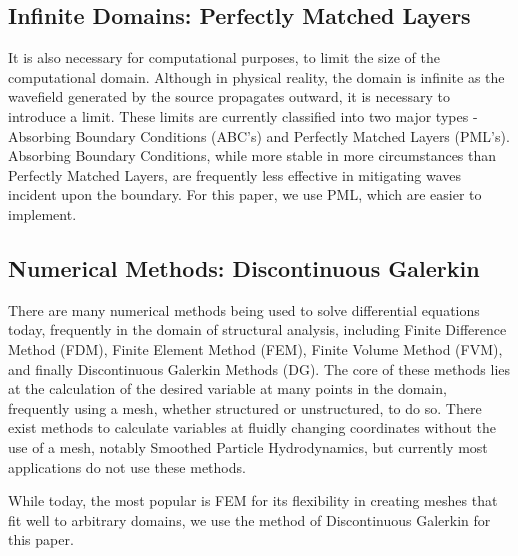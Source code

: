 \subsection{Infinite Domains: Perfectly Matched Layers}

It is also necessary for computational purposes, to limit the size of the computational domain. Although in physical reality, the domain is infinite as the wavefield generated by the source propagates outward, it is necessary to introduce a limit. These limits are currently classified into two major types - Absorbing Boundary Conditions (ABC's) and Perfectly Matched Layers (PML's). Absorbing Boundary Conditions, while more stable in more circumstances than Perfectly Matched Layers, are frequently less effective in mitigating waves incident upon the boundary. For this paper, we use PML, which are easier to implement.

\subsection{Numerical Methods: Discontinuous Galerkin}

There are many numerical methods being used to solve differential equations today, frequently in the domain of structural analysis, including Finite Difference Method (FDM), Finite Element Method (FEM), Finite Volume Method (FVM), and finally Discontinuous Galerkin Methods (DG). The core of these methods lies at the calculation of the desired variable at many points in the domain, frequently using a mesh, whether structured or unstructured, to do so. There exist methods to calculate variables at fluidly changing coordinates without the use of a mesh, notably Smoothed Particle Hydrodynamics, but currently most applications do not use these methods. 

While today, the most popular is FEM for its flexibility in creating meshes that fit well to arbitrary domains, we use the method of Discontinuous Galerkin for this paper.






